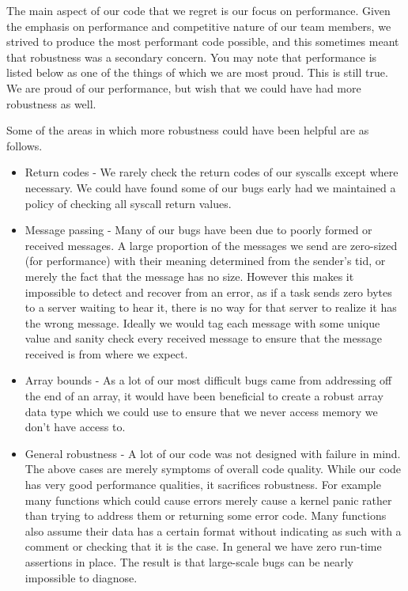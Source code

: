 \documentclass{amsart} \usepackage{amsmath} \usepackage{upgreek}
\begin{document}
The main aspect of our code that we regret is our focus on performance. Given
the emphasis on performance and competitive nature of our team members, we
strived to produce the most performant code possible, and this sometimes meant
that robustness was a secondary concern. You may note that performance is listed
below as one of the things of which we are most proud. This is still true. We
are proud of our performance, but wish that we could have had more robustness as
well.

Some of the areas in which more robustness could have been helpful are as
follows.

\begin{itemize}
    \item Return codes - We rarely check the return codes of our syscalls except
        where necessary. We could have found some of our bugs early had we
        maintained a policy of checking all syscall return values.

    \item Message passing - Many of our bugs have been due to poorly formed or
        received messages. A large proportion of the messages we send are
        zero-sized (for performance) with their meaning determined from the
        sender's tid, or merely the fact that the message has no size. However
        this makes it impossible to detect and recover from an error, as if a
        task sends zero bytes to a server waiting to hear it, there is no way
        for that server to realize it has the wrong message. Ideally we would
        tag each message with some unique value and sanity check every received
        message to ensure that the message received is from where we expect.

    \item Array bounds - As a lot of our most difficult bugs came from
        addressing off the end of an array, it would have been beneficial to
        create a robust array data type which we could use to ensure that we
        never access memory we don't have access to.

    \item General robustness - A lot of our code was not designed with failure
        in mind. The above cases are merely symptoms of overall code quality.
        While our code has very good performance qualities, it sacrifices
        robustness. For example many functions which could cause errors merely
        cause a kernel panic rather than trying to address them or returning
        some error code. Many functions also assume their data has a certain
        format without indicating as such with a comment or checking that it is
        the case. In general we have zero run-time assertions in place. The
        result is that large-scale bugs can be nearly impossible to diagnose.
\end{itemize}
\end{document}
